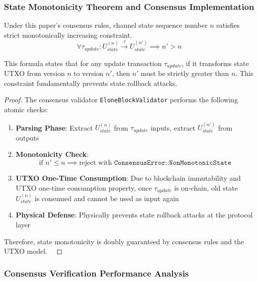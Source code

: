 \subsubsection{State Monotonicity Theorem and Consensus Implementation}

\begin{theorem}
Under this paper's consensus rules, channel state sequence number $n$ satisfies strict monotonically increasing constraint.
$$\forall \tau_{update}: U_{state}^{(n)} \xrightarrow{\tau} U_{state}^{(n')} \implies n' > n$$
\end{theorem}

This formula states that for any update transaction $\tau_{update}$, if it transforms state UTXO from version $n$ to version $n'$, then $n'$ must be strictly greater than $n$. This constraint fundamentally prevents state rollback attacks.

\begin{proof}
The consensus validator \texttt{EloneBlockValidator} performs the following atomic checks:

\begin{enumerate}
    \item \textbf{Parsing Phase}: Extract $U_{state}^{(n)}$ from $\tau_{update}$ inputs, extract $U_{state}^{(n')}$ from outputs
    
    \item \textbf{Monotonicity Check}: 
    $$\text{if } n' \leq n \implies \text{reject with } \texttt{ConsensusError::NonMonotonicState}$$
    
    \item \textbf{UTXO One-Time Consumption}: Due to blockchain immutability and UTXO one-time consumption property, once $\tau_{update}$ is on-chain, old state $U_{state}^{(n)}$ is consumed and cannot be used as input again
    
    \item \textbf{Physical Defense}: Physically prevents state rollback attacks at the protocol layer
\end{enumerate}

Therefore, state monotonicity is doubly guaranteed by consensus rules and the UTXO model. \
\end{proof}

\subsubsection{Consensus Verification Performance Analysis}

